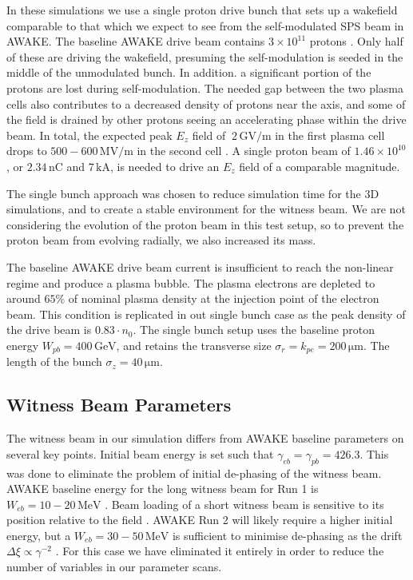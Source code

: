 \documentclass[aps,prstab,reprint,amsmath,amssymb,groupedaddress]{revtex4-1}
\newcommand{\unit}[1]{\,\mathrm{#1}}
\newcommand{\funit}[2]{\,\mathrm{#1}/\mathrm{#2}}
\newcommand{\nexp}[1]{\times 10^{#1}}
\begin{document}
In these simulations we use a single proton drive bunch that sets up a wakefield comparable to that which we expect to
see from the self-modulated SPS beam in AWAKE. The baseline AWAKE drive beam contains $3\nexp{11}$ protons
\cite{gschwendtner:2016}. Only half of these are driving the wakefield, presuming the self-modulation is seeded in the
middle of the unmodulated bunch. In addition. a significant portion of the protons are lost during self-modulation. The
needed gap between the two plasma cells also contributes to a decreased density of protons near the axis, and some of
the field is drained by other protons seeing an accelerating phase within the drive beam. In total, the expected peak
$E_{z}$ field of $~2\funit{GV}{m}$ in the first plasma cell drops to $500-600\funit{MV}{m}$ in the second cell
\cite{awake_collaboration:2016}. A single proton beam of $1.46\nexp{10}$, or $2.34\unit{nC}$ and $7\unit{kA}$, is needed
to drive an $E_{z}$ field of a comparable magnitude.

The single bunch approach was chosen to reduce simulation time for the 3D simulations, and to create a stable
environment for the witness beam. We are not considering the evolution of the proton beam in this test setup, so to
prevent the proton beam from evolving radially, we also increased its mass.

The baseline AWAKE drive beam current is insufficient to reach the non-linear regime and produce a plasma bubble. The
plasma electrons are depleted to around $65\%$ of nominal plasma density at the injection point of the electron beam.
This condition is replicated in out single bunch case as the peak density of the drive beam is $0.83\cdot n_{0}$. The
single bunch setup uses the baseline proton energy $W_{pb} = 400\unit{GeV}$, and retains the transverse size
$\sigma_{r} = k_{pe} = 200\unit{\mu m}$. The length of the bunch $\sigma_{z} = 40\unit{\mu m}$.

\subsection[\label{S:M:Setup}]{Witness Beam Parameters}

The witness beam in our simulation differs from AWAKE baseline parameters on several key points. Initial beam energy is
set such that $\gamma_{eb} = \gamma_{pb} = 426.3$. This was done to eliminate the problem of initial de-phasing of the
witness beam. AWAKE baseline energy for the long witness beam for Run 1 is $W_{eb} = 10-20\unit{MeV}$
\cite{gschwendtner:2016}. Beam loading of a short witness beam is sensitive to its position relative to the field
\cite{tzoufras:2009}. AWAKE Run 2 will likely require a higher initial energy, but a $W_{eb} = 30-50\unit{MeV}$ is
sufficient to minimise de-phasing as the drift $\Delta\xi \propto \gamma^{-2}$ \cite{berglyd_olsen:2015}. For this case
we have eliminated it entirely in order to reduce the number of variables in our parameter scans.
\end{document}
